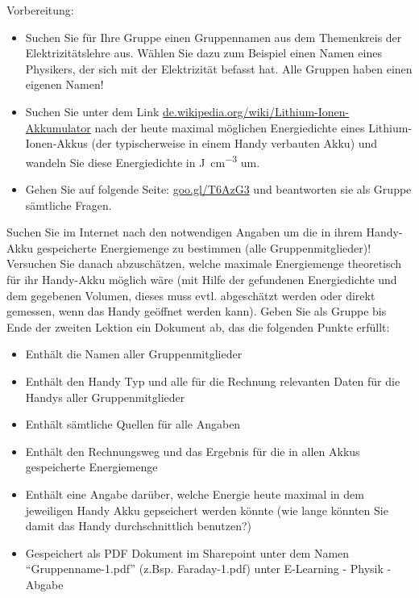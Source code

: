 \documentclass[11pt,twoside=false,open=any]{scrbook}
\begin{document}
\begin{tcolorbox}[breakable,colback=gray!20, title=Auftrag 1: Die Energiemenge im Handy-Akku]
Vorbereitung:
\begin{itemize}
    \item Suchen Sie für Ihre Gruppe einen Gruppennamen aus dem Themenkreis der Elektrizitätslehre aus. Wählen Sie dazu zum Beispiel einen Namen eines Physikers, der sich mit der Elektrizität befasst hat. Alle Gruppen haben einen eigenen Namen!
    \item Suchen Sie unter dem Link \href{https://de.wikipedia.org/wiki/Lithium-Ionen-Akkumulator}{de.wikipedia.org/wiki/Lithium-Ionen-Akkumulator} nach der heute maximal möglichen Energiedichte eines Lithium-Ionen-Akkus (der typischerweise in einem Handy verbauten Akku) und wandeln Sie diese Energiedichte in \si{\joule \per \centi \metre \cubed} um.
    \item Gehen Sie auf folgende Seite: \href{https://goo.gl/T6AzG3}{goo.gl/T6AzG3} und beantworten sie als Gruppe sämtliche Fragen. 
    
    \end{itemize}
Suchen Sie im Internet nach den notwendigen Angaben um die in ihrem Handy-Akku gespeicherte Energiemenge zu bestimmen (alle Gruppenmitglieder)! Versuchen Sie danach abzuschätzen, welche maximale Energiemenge theoretisch für ihr Handy-Akku möglich wäre (mit Hilfe der gefundenen Energiedichte und dem gegebenen Volumen, dieses muss evtl. abgeschätzt werden oder direkt gemessen, wenn das Handy geöffnet werden kann). Geben Sie als Gruppe bis Ende der zweiten Lektion ein Dokument ab, das die folgenden Punkte erfüllt:
\begin{itemize}
    \item Enthält die Namen aller Gruppenmitglieder
    \item Enthält den Handy Typ und alle für die Rechnung relevanten Daten für die Handys aller Gruppenmitglieder
    \item Enthält sämtliche Quellen für alle Angaben
    \item Enthält den Rechnungsweg und das Ergebnis für die in allen Akkus gespeicherte Energiemenge
    \item Enthält eine Angabe darüber, welche Energie heute maximal in dem jeweiligen Handy Akku gepseichert werden könnte (wie lange könnten Sie damit das Handy durchschnittlich benutzen?)
    \item Gespeichert als PDF Dokument im Sharepoint unter dem Namen ``Gruppenname-1.pdf'' (z.Bsp. Faraday-1.pdf) unter E-Learning - Physik - Abgabe
\end{itemize}


\end{tcolorbox}
\end{document}
